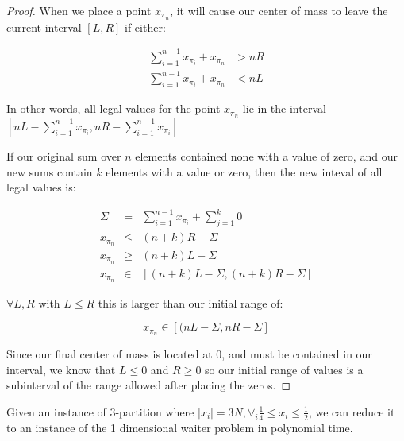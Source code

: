 \documentclass[11pt,twocolumn]{article}
\begin{document}
\begin{proof}
When we place a point $x_{\pi_n}$, it will cause our center of mass to leave the current interval $[L, R]$ if either:

\begin{align*} 
\sum_{i=1}^{n-1} x_{\pi_i} + x_{\pi_n} &> n R \\
\sum_{i=1}^{n-1} x_{\pi_i} + x_{\pi_n} &< n L
\end{align*}

In other words, all legal values for the point $x_{\pi_n}$ lie in the interval $[ n L - \sum_{i=1}^{n-1} x_{\pi_i}, n R - \sum_{i=1}^{n-1} x_{\pi_i}] $

If our original sum over $n$ elements contained none with a value of zero, and our new sums contain $k$ elements with a value or zero, then the new inteval of all legal values is:

\begin{eqnarray*}
\Sigma &=& \sum_{i=1}^{n-1} x_{\pi_i} + \sum_{j=1}^k 0 \\
x_{\pi_n} &\leq& (n+k) R - \Sigma \\
x_{\pi_n} &\geq& (n+k) L - \Sigma \\
x_{\pi_n} &\in& [ (n+k) L - \Sigma, (n+k) R - \Sigma ]
\end{eqnarray*}

$\forall L, R$ with $L \leq R$ this is larger than our initial range of:

\begin{equation*}
x_{\pi_n} \in [ (n L - \Sigma, n R - \Sigma ]
\end{equation*}

Since our final center of mass is located at 0, and must be contained in our interval, we know that $L\leq 0$ and $R\geq 0$ so our initial range of values is a subinterval of the range allowed after placing the zeros.
\end{proof}

\begin{thm}\label{thm:completeness}
Given an instance of 3-partition where $ |x_i| = 3N, \forall_i \frac{1}{4} \leq x_i \leq \frac{1}{2} $, we can reduce it to an instance of the 1 dimensional waiter problem in polynomial time.  
\end{thm}
\end{document}
